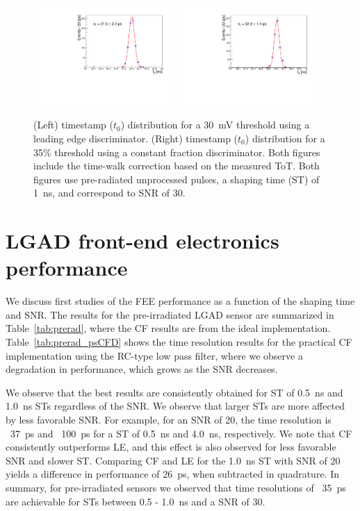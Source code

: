 \documentclass[preprint,1p]{elsarticle}
\begin{document}
  \begin{figure}[htbp]
    \centering
    \includegraphics[width=0.48\textwidth]{figs/pre_rad_st_1ns_snr_30_le_tot_threshold_30mV.pdf} \hfill
    \includegraphics[width=0.48\textwidth]{figs/pre_rad_st_1ns_snr_30_cfd_tot_threshold_35_percent_v2.pdf}
    \caption{(Left) timestamp ($t_{0}$) distribution for a 30~\si{mV} threshold using a leading edge discriminator.
    (Right) timestamp ($t_{0}$) distribution for a 35\% threshold using a constant fraction discriminator. Both figures
    include the time-walk correction based on the measured ToT.
    Both figures use pre-radiated unprocessed pulses, a shaping time (ST) of 1~\si{ns}, and correspond to SNR of 30.}
    \label{fig:time_res}
  \end{figure}
  
  

\section{LGAD front-end electronics performance}\label{sec:results}

We discuss first studies of the FEE performance as a function of the shaping time and SNR.
The results for the pre-irradiated LGAD sensor are summarized in Table~\ref{tab:prerad},
where the CF results are from the ideal implementation.  Table~\ref{tab:prerad_psCFD}
shows the time resolution results for the practical CF implementation using the RC-type low pass filter,
where we observe a degradation in performance, which grows as the SNR decreases.

We observe that the best results are consistently obtained for ST of 0.5~\si{ns} and 1.0~\si{ns} STs regardless of the SNR. 
We observe that larger STs are more affected by less favorable SNR. For example, for an SNR of 20, the time resolution is ~37~\si{ps} and ~100~\si{ps} for a ST of 0.5~\si{ns} and 4.0~\si{ns}, respectively. We note that CF consistently outperforms 
LE, and this effect is also observed for less favorable SNR and slower ST. Comparing CF and LE for the 1.0~\si{ns} ST 
with SNR of 20 yields a difference in performance of 26~\si{ps}, when subtracted in quadrature. In summary, for 
pre-irradiated sensors we observed that time resolutions of ~35~\si{ps} are achievable for
STs between 0.5 - 1.0~\si{ns} and a SNR of 30.
\end{document}

